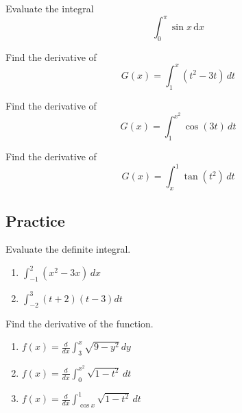 \begin{example}

Evaluate the integral \[ \int_0^\pi \sin x \,\mathrm{d}x\]

\end{example}
\vspace*{6\baselineskip}

\begin{example}

Find the derivative of \[G(x)=\int_1^x (t^2-3t)\,dt\]

\end{example}
\vspace*{6\baselineskip}

\begin{example}

Find the derivative of \[G(x)=\int_1^{x^2} \cos(3t)\,dt\]

\end{example}
\vspace*{6\baselineskip}

\begin{example}

Find the derivative of \[G(x)=\int_x^1 \tan(t^2)\,dt\]

\end{example}
\vspace*{6\baselineskip}

\subsection{Practice}

\begin{exercise}

Evaluate the definite integral.

\begin{enumerate}
\item
  \(\displaystyle \int^2_{-1}(x^2-3x)\,dx\)
\item
  \(\displaystyle \int^3_{-2}(t+2)(t-3)dt\)
\end{enumerate}

\end{exercise}

\begin{exercise}

Find the derivative of the function.

\begin{enumerate}
\item
  \(\displaystyle f(x)=\frac{d}{dx}\int^x_3\sqrt{9-y^2}\,dy\)
\item
  \(\displaystyle f(x)=\frac{d}{dx}\int^{x^2}_0\sqrt{1-t^2}\,dt\)
\item
  \(\displaystyle f(x)=\frac{d}{dx}\int^1_{\cos x}\sqrt{1-t^2}\,dt\)
\end{enumerate}

\end{exercise}

